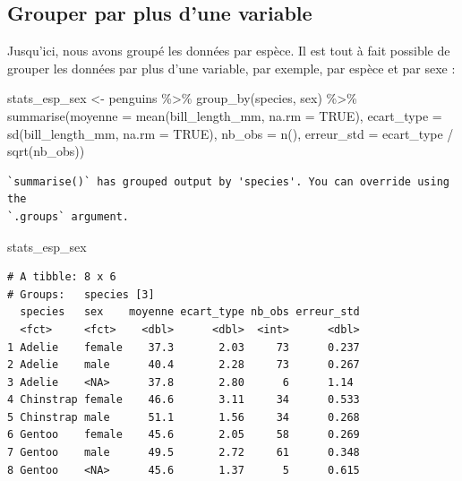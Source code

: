 \documentclass[
  a4paper,
  DIV=11,
  numbers=noendperiod,
  oneside]{scrreprt}
\newenvironment{Shaded}{}{}
\newcommand{\AttributeTok}[1]{\textcolor[rgb]{0.84,0.23,0.29}{#1}}
\newcommand{\ConstantTok}[1]{\textcolor[rgb]{0.00,0.36,0.77}{#1}}
\newcommand{\FunctionTok}[1]{\textcolor[rgb]{0.44,0.26,0.76}{#1}}
\newcommand{\NormalTok}[1]{\textcolor[rgb]{0.14,0.16,0.18}{#1}}
\newcommand{\OtherTok}[1]{\textcolor[rgb]{0.44,0.26,0.76}{#1}}
\newcommand{\SpecialCharTok}[1]{\textcolor[rgb]{0.00,0.36,0.77}{#1}}
\begin{document}
\hypertarget{grouper-par-plus-dune-variable}{%
\subsection{Grouper par plus d'une
variable}\label{grouper-par-plus-dune-variable}}

Jusqu'ici, nous avons groupé les données par espèce. Il est tout à fait
possible de grouper les données par plus d'une variable, par exemple,
par espèce et par sexe :

\begin{Shaded}
\begin{Highlighting}[]
\NormalTok{stats\_esp\_sex }\OtherTok{\textless{}{-}}\NormalTok{ penguins }\SpecialCharTok{\%\textgreater{}\%}
  \FunctionTok{group\_by}\NormalTok{(species, sex) }\SpecialCharTok{\%\textgreater{}\%}
  \FunctionTok{summarise}\NormalTok{(}\AttributeTok{moyenne =} \FunctionTok{mean}\NormalTok{(bill\_length\_mm, }\AttributeTok{na.rm =} \ConstantTok{TRUE}\NormalTok{),}
            \AttributeTok{ecart\_type =} \FunctionTok{sd}\NormalTok{(bill\_length\_mm, }\AttributeTok{na.rm =} \ConstantTok{TRUE}\NormalTok{),}
            \AttributeTok{nb\_obs =} \FunctionTok{n}\NormalTok{(),}
            \AttributeTok{erreur\_std =}\NormalTok{ ecart\_type }\SpecialCharTok{/} \FunctionTok{sqrt}\NormalTok{(nb\_obs))}
\end{Highlighting}
\end{Shaded}

\begin{verbatim}
`summarise()` has grouped output by 'species'. You can override using the
`.groups` argument.
\end{verbatim}

\begin{Shaded}
\begin{Highlighting}[]
\NormalTok{stats\_esp\_sex}
\end{Highlighting}
\end{Shaded}

\begin{verbatim}
# A tibble: 8 x 6
# Groups:   species [3]
  species   sex    moyenne ecart_type nb_obs erreur_std
  <fct>     <fct>    <dbl>      <dbl>  <int>      <dbl>
1 Adelie    female    37.3       2.03     73      0.237
2 Adelie    male      40.4       2.28     73      0.267
3 Adelie    <NA>      37.8       2.80      6      1.14 
4 Chinstrap female    46.6       3.11     34      0.533
5 Chinstrap male      51.1       1.56     34      0.268
6 Gentoo    female    45.6       2.05     58      0.269
7 Gentoo    male      49.5       2.72     61      0.348
8 Gentoo    <NA>      45.6       1.37      5      0.615
\end{verbatim}
\end{document}
